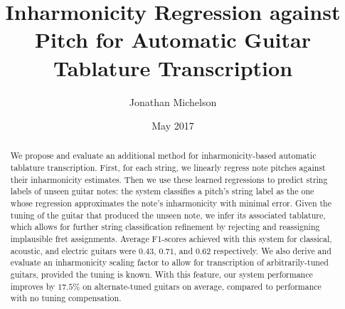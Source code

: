 \documentclass[12pt]{cmuthesis}
\begin{document}
 
\frontmatter

\pagestyle{empty}

\title{ %
{\bf Inharmonicity Regression against Pitch for Automatic Guitar Tablature Transcription}}
\author{Jonathan Michelson}
\date{May 2017}
\trnumber{}


\support{}
\disclaimer{}



\maketitle


\pagestyle{plain} %


\begin{abstract}
We propose and evaluate an additional method for inharmonicity-based automatic tablature transcription. First, for each string, we linearly regress note pitches against their inharmonicity estimates. Then we use these learned regressions to predict string labels of unseen guitar notes: the system classifies a pitch's string label as the one whose regression approximates the note's inharmonicity with minimal error. Given the tuning of the guitar that produced the unseen note, we infer its associated tablature, which allows for further string classification refinement by rejecting and reassigning implausible fret assignments. Average F1-scores achieved with this system for classical, acoustic, and electric guitars were $0.43$, $0.71$, and $0.62$ respectively. We also derive and evaluate an inharmonicity scaling factor to allow for transcription of arbitrarily-tuned guitars, provided the tuning is known. With this feature, our system performance improves by $17.5\%$ on alternate-tuned guitars on average, compared to performance with no tuning compensation.

\end{abstract}
\end{document}
